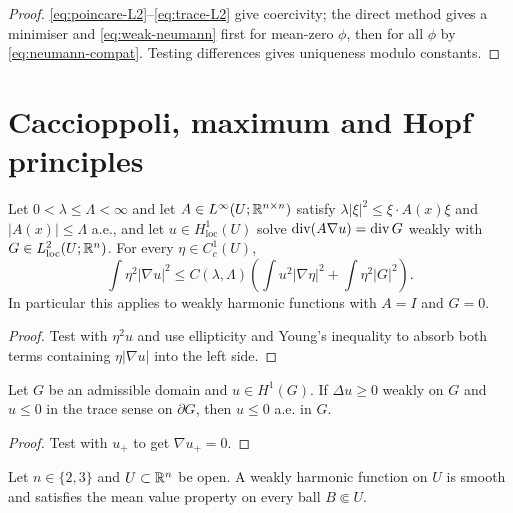 \begin{proof}
\eqref{eq:poincare-L2}--\eqref{eq:trace-L2} give coercivity; the direct
method gives a minimiser and \eqref{eq:weak-neumann} first for mean-zero
$\phi$, then for all $\phi$ by \eqref{eq:neumann-compat}.  Testing differences
gives uniqueness modulo constants.
\end{proof}

\section{Caccioppoli, maximum and Hopf principles}

\begin{lemma}[Caccioppoli]\label{lem:caccioppoli}
Let $0<\lambda\le\Lambda<\infty$ and let
$A\in L^\infty(U;\mathbb R^{n\times n})$ satisfy
$\lambda|\xi|^2\le \xi\cdot A(x)\xi$ and $|A(x)|\le\Lambda$ a.e., and let
$u\in H^1_{\mathrm{loc}}(U)$ solve
$\operatorname{div}(A\nabla u)=\operatorname{div} G$ weakly with $G\in L^2_{\mathrm{loc}}(U;\mathbb R^n)$.
For every $\eta\in C^1_c(U)$,
\begin{equation}\label{eq:caccioppoli}
  \int\eta^2|\nabla u|^2
  \le C(\lambda,\Lambda)
     \left(\int u^2|\nabla\eta|^2+\int\eta^2|G|^2\right).
\end{equation}
In particular this applies to weakly harmonic functions with $A=I$ and
$G=0$.
\end{lemma}

\begin{proof}
Test with $\eta^2u$ and use ellipticity and Young's inequality to absorb both
terms containing $\eta|\nabla u|$ into the left side.
\end{proof}

\begin{lemma}\label{lem:weak-max}
Let $G$ be an admissible domain and $u\in H^1(G)$.  If
$\Delta u\ge0$ weakly on $G$ and $u\le0$ in the trace sense on
$\partial G$, then $u\le0$ a.e. in $G$.
\end{lemma}

\begin{proof}
Test with $u_+$ to get $\nabla u_+=0$.
\end{proof}

\begin{lemma}\label{lem:mean-value}
Let $n\in\{2,3\}$ and $U\subset\mathbb R^n$ be open.  A weakly harmonic function
on $U$ is smooth and satisfies the mean value property on every ball
$B\Subset U$.
\end{lemma}

